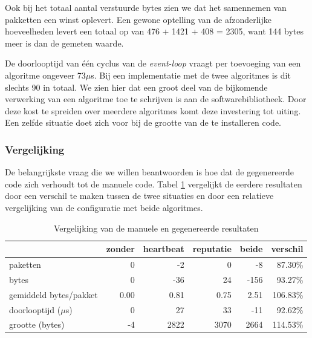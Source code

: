 Ook bij het totaal aantal verstuurde bytes zien we dat het samennemen van
pakketten een winst oplevert. Een gewone optelling van de afzonderlijke
hoeveelheden levert een totaal op van 476 + 1421 + 408 = 2305, want 144 bytes
meer is dan de gemeten waarde.

De doorlooptijd van \'e\'en cyclus van de \emph{event-loop} vraagt per
toevoeging van een algoritme ongeveer 73$\mu$s. Bij een implementatie met de
twee algoritmes is dit slechts 90 in totaal. We zien hier dat een groot deel
van de bijkomende verwerking van een algoritme toe te schrijven is aan de
softwarebibliotheek. Door deze kost te spreiden over meerdere algoritmes komt
deze investering tot uiting. Een zelfde situatie doet zich voor bij de grootte
van de te installeren code.

\subsubsection{Vergelijking}

De belangrijkste vraag die we willen beantwoorden is hoe dat de gegenereerde
code zich verhoudt tot de manuele code. Tabel \ref{tbl:comparison} vergelijkt
de eerdere resultaten door een verschil te maken tussen de twee situaties en
door een relatieve vergelijking van de configuratie met beide algoritmes.

\begin{table}[H]
  \centering
  \begin{tabular}{l|r|rrrr}
  \hline
  & zonder & heartbeat & reputatie & beide & verschil\\
  \hline
  \hline

paketten               &  0    &   -2    &    0    &   -8    & \cellcolor{green!25} 87.30\% \\
bytes                  &  0    &  -36    &   24    & -156    & \cellcolor{green!25} 93.27\% \\
gemiddeld bytes/pakket &  0.00 &    0.81 &    0.75 &    2.51 & \cellcolor{red!25}  106.83\% \\
doorlooptijd ($\mu$s)  &  0    &   27    &   33    &  -11    & \cellcolor{green!25} 92.62\% \\
grootte (bytes)        & -4    & 2822    & 3070    & 2664    & \cellcolor{red!25}  114.53\% \\

  \hline
  \end{tabular}
  \caption{Vergelijking van de manuele en gegenereerde resultaten}
  \label{tbl:comparison}
\end{table}

